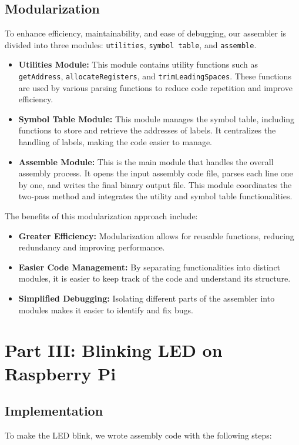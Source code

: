 \documentclass{article}
\begin{document}
\subsection{Modularization}
To enhance efficiency, maintainability, and ease of debugging, our assembler is divided into three modules: \texttt{utilities}, \texttt{symbol table}, and \texttt{assemble}.

\begin{itemize}
    \item \textbf{Utilities Module:} This module contains utility functions such as \texttt{getAddress}, \texttt{allocateRegisters}, and \texttt{trimLeadingSpaces}. These functions are used by various parsing functions to reduce code repetition and improve efficiency.
    \item \textbf{Symbol Table Module:} This module manages the symbol table, including functions to store and retrieve the addresses of labels. It centralizes the handling of labels, making the code easier to manage.
    \item \textbf{Assemble Module:} This is the main module that handles the overall assembly process. It opens the input assembly code file, parses each line one by one, and writes the final binary output file. This module coordinates the two-pass method and integrates the utility and symbol table functionalities.
\end{itemize}

The benefits of this modularization approach include:
\begin{itemize}
    \item \textbf{Greater Efficiency:} Modularization allows for reusable functions, reducing redundancy and improving performance.
    \item \textbf{Easier Code Management:} By separating functionalities into distinct modules, it is easier to keep track of the code and understand its structure.
    \item \textbf{Simplified Debugging:} Isolating different parts of the assembler into modules makes it easier to identify and fix bugs.
\end{itemize}

\section{Part III: Blinking LED on Raspberry Pi}
\label{sec:part3}
\subsection{Implementation}
To make the LED blink, we wrote assembly code with the following steps:
\end{document}
